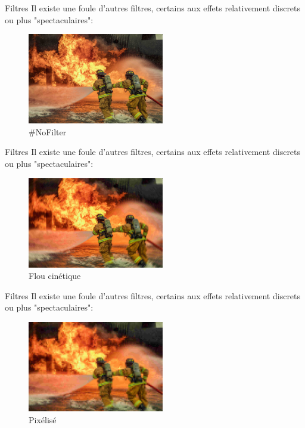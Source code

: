 \documentclass[10pt,svgnames,usenames,table]{beamer}
\begin{document}
\begin{frame}{Filtres}
		Il existe une foule d'autres filtres, certains aux effets relativement discrets ou plus "spectaculaires":
		
		\begin{figure}[H]
			\centering
				\includegraphics[height=150px]{Images/filters/compressed_original} 
				\caption{\#NoFilter}
			\end{figure}		
	\end{frame}

	\begin{frame}{Filtres}
		Il existe une foule d'autres filtres, certains aux effets relativement discrets ou plus "spectaculaires":
		
		\begin{figure}[H]
			\centering
				\includegraphics[height=150px]{Images/filters/motion_blur} 
				\caption{Flou cinétique}
			\end{figure}		
	\end{frame}

\begin{frame}{Filtres}
		Il existe une foule d'autres filtres, certains aux effets relativement discrets ou plus "spectaculaires":
		
		\begin{figure}[H]
			\centering	
				\includegraphics[height=150px]{Images/filters/pixelize} 
				\caption{Pixélisé}
			\end{figure}		
	\end{frame}
\end{document}
